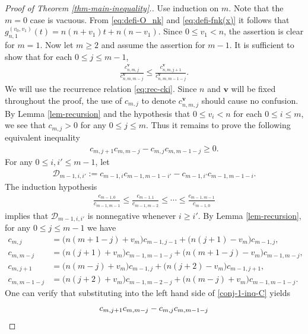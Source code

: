 \documentclass[12pt]{article}
\numberwithin{equation}{section}
\begin{document}
\begin{proof}[Proof of Theorem \ref{thm-main-inequality}.]
Use induction on $m$. Note that the $m=0$ case is vacuous. 
From \eqref{eq:defi-O_nk} and \eqref{eq:defi-fnk(x)} it follows that 
$g^{{(v_0,v_1)}}_{n,1}(t)=n(n+v_1)t+n(n-v_1)$. Since $0\leq v_1<n$, 
the assertion is clear for $m=1$.
Now let $m\geq 2$ and assume the assertion for $m-1$.
It is sufficient to show that for each $0\leq j\leq m-1$,
\begin{align*}%
        \frac{c^{\mathbf{v}}_{n,m,j}}{c^{\mathbf{v}}_{n,m,m-j}}\le\frac{c^{\mathbf{v}}_{n,m,j+1}}{c^{\mathbf{v}}_{n,m,m-1-j}}.
    \end{align*} 
We will use the recurrence relation \eqref{eq:rec-cki}. Since $n$ and $\mathbf{v}$ will be fixed throughout the proof, the use of $c_{m,j}$ to denote $c^{\mathbf v}_{n,m,j}$ should cause no confusion. 
By Lemma \ref{lem-recursion} and the hypothesis that $0\leq v_i<n$ for each $0\leq i\leq m$,
we see that $c_{m,j}> 0$ for any $0 \le j \le m$.
Thus it remains to prove the following equivalent inequality
    \begin{align}\label{conj-1-inq-C}
      c_{m,j+1}c_{m,m-j}-  c_{m,j}c_{m,m-1-j}\ge 0.
    \end{align}
For any $0\leq i,i' \leq m-1$, let
\begin{align*}
\mathcal{D}_{m-1,i,i'}:=c_{m-1,i}c_{m-1,m-1-i'}-c_{m-1,i'}c_{m-1,m-1-i}.
 \end{align*}
The induction hypothesis
    \begin{align*}
        \frac{c_{m-1,0}}{c_{m-1,m-1}}\le\frac{c_{m-1,1}}{c_{m-1,m-2}}\le\cdots\le\frac{c_{m-1,m-1}}{c_{m-1,0}}
    \end{align*}
implies that $\mathcal{D}_{m-1,i,i'}$ is nonnegative whenever $i\geq i'$. 
By Lemma \ref{lem-recursion}, for any $0\leq j \leq m-1$ we have 
\begin{align*}
c_{m,j}&=\big(n(m+1-j)+v_m\big)c_{m-1,j-1}+\big(n(j+1)-v_m\big)c_{m-1,j},\\
c_{m,m-j}&=\big(n(j+1)+v_m\big)c_{m-1,m-1-j}+\big(n(m+1-j)-v_m\big)c_{m-1,m-j},\\
c_{m,j+1}&=\big(n(m-j)+v_m\big)c_{m-1,j}+\big(n(j+2)-v_m\big)c_{m-1,j+1},\\
c_{m,m-1-j}&=\big(n(j+2)+v_m\big)c_{m-1,m-2-j}+\big(n(m-j)+v_m\big)c_{m-1,m-1-j}.
\end{align*}
One can verify that substituting into 
the left hand side of \eqref{conj-1-inq-C} yields
\begin{align}
       c_{m,j+1}c_{m,m-j}&- c_{m,j}c_{m,m-1-j}\notag\\

\end{align}
\end{proof}
\end{document}
